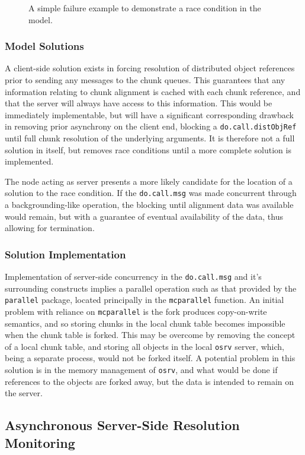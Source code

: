\begin{figure}
	\centering
	
	\caption{\label{fig:counterex}A simple failure example to demonstrate a race condition in the model.}
\end{figure}

\subsubsection{Model Solutions}

A client-side solution exists in forcing resolution of distributed object
references prior to sending any messages to the chunk queues.
This guarantees that any information relating to chunk alignment is cached with
each chunk reference, and that the server will always have access to this
information.
This would be immediately implementable, but will have a significant
corresponding drawback in removing prior asynchrony on the client end, blocking
a \texttt{do.call.distObjRef} until full chunk resolution of the
underlying arguments.
It is therefore not a full solution in itself, but removes race conditions
until a more complete solution is implemented.

The node acting as server presents a more likely candidate for the location of
a solution to the race condition.
If the \texttt{do.call.msg} was made concurrent through a
backgrounding-like operation, the blocking until alignment data was available
would remain, but with a guarantee of eventual availability of the data, thus
allowing for termination.

\subsubsection{Solution Implementation}

Implementation of server-side concurrency in the
\texttt{do.call.msg} and it's surrounding constructs implies a
parallel operation such as that provided by the \texttt{parallel} package,
located principally in the \texttt{mcparallel} function.
An initial problem with reliance on \texttt{mcparallel} is the
fork produces copy-on-write semantics, and so storing chunks in the local chunk
table becomes impossible when the chunk table is forked.
This may be overcome by removing the concept of a local chunk table, and
storing all objects in the local \texttt{osrv} server, which, being a separate
process, would not be forked itself. 
A potential problem in this solution is in the memory management of
\texttt{osrv}, and what would be done if references to the \R objects are forked
away, but the data is intended to remain on the server.

\subsection{Asynchronous Server-Side Resolution Monitoring}

